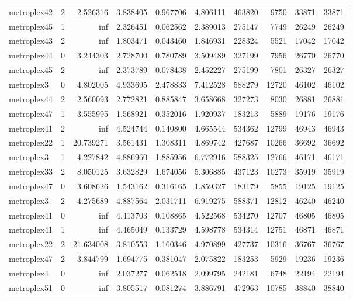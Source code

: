 \begin{longtable}{|l|r|r|r|r|r|r|r|r|r|}
metroplex42 & 2 & 2.526316 & 3.838405 & 0.967706 & 4.806111 & 463820 & 9750 & 33871 & 33871 \\
metroplex45 & 1 & inf & 2.326451 & 0.062562 & 2.389013 & 275147 & 7749 & 26249 & 26249 \\
metroplex43 & 2 & inf & 1.803471 & 0.043460 & 1.846931 & 228324 & 5521 & 17042 & 17042 \\
metroplex44 & 0 & 3.244303 & 2.728700 & 0.780789 & 3.509489 & 327199 & 7956 & 26770 & 26770 \\
metroplex45 & 2 & inf & 2.373789 & 0.078438 & 2.452227 & 275199 & 7801 & 26327 & 26327 \\
metroplex3 & 0 & 4.802005 & 4.933695 & 2.478833 & 7.412528 & 588279 & 12720 & 46102 & 46102 \\
metroplex44 & 2 & 2.560093 & 2.772821 & 0.885847 & 3.658668 & 327273 & 8030 & 26881 & 26881 \\
metroplex47 & 1 & 3.555995 & 1.568921 & 0.352016 & 1.920937 & 183213 & 5889 & 19176 & 19176 \\
metroplex41 & 2 & inf & 4.524744 & 0.140800 & 4.665544 & 534362 & 12799 & 46943 & 46943 \\
metroplex22 & 1 & 20.739271 & 3.561431 & 1.308311 & 4.869742 & 427687 & 10266 & 36692 & 36692 \\
metroplex3 & 1 & 4.227842 & 4.886960 & 1.885956 & 6.772916 & 588325 & 12766 & 46171 & 46171 \\
metroplex33 & 2 & 8.050125 & 3.632829 & 1.674056 & 5.306885 & 437123 & 10273 & 35919 & 35919 \\
metroplex47 & 0 & 3.608626 & 1.543162 & 0.316165 & 1.859327 & 183179 & 5855 & 19125 & 19125 \\
metroplex3 & 2 & 4.275689 & 4.887564 & 2.031711 & 6.919275 & 588371 & 12812 & 46240 & 46240 \\
metroplex41 & 0 & inf & 4.413703 & 0.108865 & 4.522568 & 534270 & 12707 & 46805 & 46805 \\
metroplex41 & 1 & inf & 4.465049 & 0.133729 & 4.598778 & 534314 & 12751 & 46871 & 46871 \\
metroplex22 & 2 & 21.634008 & 3.810553 & 1.160346 & 4.970899 & 427737 & 10316 & 36767 & 36767 \\
metroplex47 & 2 & 3.844799 & 1.694775 & 0.381047 & 2.075822 & 183253 & 5929 & 19236 & 19236 \\
metroplex4 & 0 & inf & 2.037277 & 0.062518 & 2.099795 & 242181 & 6748 & 22194 & 22194 \\
metroplex51 & 0 & inf & 3.805517 & 0.081274 & 3.886791 & 472963 & 10785 & 38840 & 38840 \\

\end{longtable}
